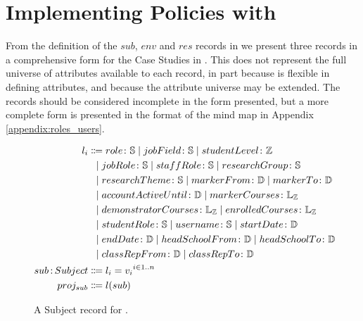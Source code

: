\section{Implementing Policies with \thePolicyLang}
\label{sec:design_impl_pol_lang}

From the definition of the $sub$, $env$ and $res$ records in  we present three records in a comprehensive form for the Case Studies in . This does not represent the full universe of attributes available to each record, in part because \OpenABE is flexible in defining attributes, and because the attribute universe may be extended. The records should be considered incomplete in the form presented, but a more complete form is presented in the format of the mind map in Appendix \ref{appendix:roles_users}.

\begin{figure}[ht]
  \centering
\begin{align*}
  l_{i}
  &
    \Coloneqq
    role \colon \mathbb{S}
    \alt
    jobField \colon \mathbb{S}
    \alt
    studentLevel \colon \mathbb{Z}
  \\
  &
    \firstAlt
    jobRole \colon \mathbb{S}
    \alt
    staffRole \colon \mathbb{S}
    \alt
    researchGroup \colon \mathbb{S}
  \\
  &
    \firstAlt
    researchTheme \colon \mathbb{S}
    \alt
    markerFrom \colon \mathbb{D}
    \alt
    markerTo \colon \mathbb{D}
  \\
  &
    \firstAlt
    accountActiveUntil \colon \mathbb{D}
    \alt
    markerCourses \colon \mathbb{L}_{\mathbb{Z}}
  \\
  &
    \firstAlt
    demonstratorCourses \colon \mathbb{L}_{\mathbb{Z}}
    \alt
    enrolledCourses \colon \mathbb{L}_{\mathbb{Z}}
  \\
  &
    \firstAlt
    studentRole \colon \mathbb{S}
    \alt
    username \colon \mathbb{S}
    \alt
    startDate \colon \mathbb{D}
  \\
  &
    \firstAlt
    endDate \colon \mathbb{D}
    \alt
    headSchoolFrom \colon \mathbb{D}
    \alt
    headSchoolTo \colon \mathbb{D}
  \\
  &
    \firstAlt
    classRepFrom \colon \mathbb{D}
    \alt
    classRepTo \colon \mathbb{D}
  \\
  \ty{sub}{Subject}
  &
    \Coloneqq
    { l_{i} = v_{i}}^{i\in 1..n}
  \\
  proj_{sub}
  &
    \Coloneqq
    l(sub)
\end{align*}
  \caption{
    \label{fig:case_sub_record}
    A Subject record for \thePolicyLang.
  }
\end{figure}

